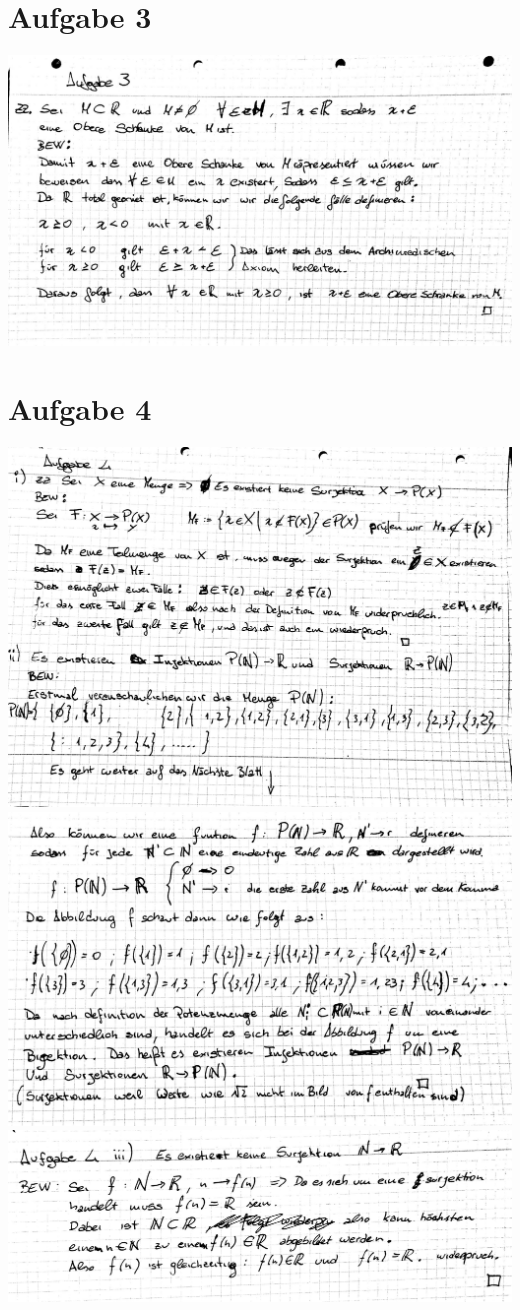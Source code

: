\documentclass[12pt,a4paper,landscape]{article}
\begin{document}
\section{Aufgabe 3}
\includegraphics[scale=0.2]{AB4_6.jpg} \newpage

\section{Aufgabe 4}
\includegraphics[scale=0.2]{AB4_7.jpg} \newpage 
\includegraphics[scale=0.2]{AB4_8.jpg} \newpage 
\includegraphics[scale=0.2]{AB4_9.jpg} \newpage 
\end{document}

